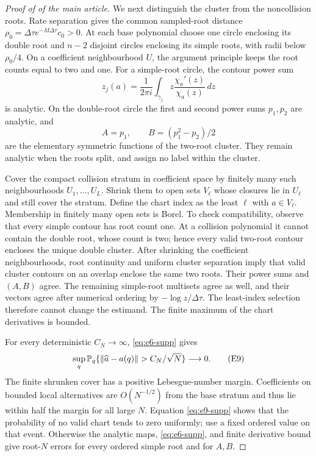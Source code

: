 \begin{proof}[Proof of  of the main article]
We next distinguish the cluster from the noncollision roots.  Rate separation
gives the common sampled-root distance
\(\rho_0=\Delta\tau e^{-M\Delta\tau}c_0>0\).  At each base polynomial choose
one circle enclosing its double root and \(n-2\) disjoint circles enclosing
its simple roots, with radii below \(\rho_0/4\).  On a coefficient
neighbourhood \(U\), the argument principle keeps the root counts equal to
two and one.  For a simple-root circle, the contour power sum
\[
 z_j(a)=\frac1{2\pi i}\int_{\gamma_j}
 z\frac{\chi_a'(z)}{\chi_a(z)}\,dz
\tag{E7}\label{eq:e7-supp}
\]
is analytic.  On the double-root circle the first and second power sums
\(p_1,p_2\) are analytic, and
\[
 A=p_1,\qquad B=(p_1^2-p_2)/2
\tag{E8}\label{eq:e8-supp}
\]
are the elementary symmetric functions of the two-root cluster.  They remain
analytic when the roots split, and assign no label within the cluster.

Cover the compact collision stratum in coefficient space by finitely many
such neighbourhoods \(U_1,\ldots,U_L\).  Shrink them to open sets
\(V_\ell\) whose closures lie in \(U_\ell\) and still cover the stratum.
Define the chart index as the least \(\ell\) with
\(\widehat a\in V_\ell\).  Membership in finitely many open sets is Borel.
To check compatibility, observe that every simple contour has root count one.
At a collision polynomial it cannot contain the double root, whose count is
two; hence every valid two-root contour encloses the unique double cluster.
After shrinking the coefficient neighbourhoods, root continuity and uniform
cluster separation imply that valid cluster contours on an overlap enclose
the same two roots.  Their power sums and \((A,B)\) agree.  The remaining
simple-root multisets agree as well, and their vectors agree after numerical
ordering by \(-\log z/\Delta\tau\).  The least-index selection therefore
cannot change the estimand.  The finite maximum of the chart derivatives is
bounded.

For every deterministic \(C_N\to\infty\), \eqref{eq:e6-supp} gives
\[
 \sup_q\PP_q\{\|\widehat a-a(q)\|>C_N/\sqrt N\}\longrightarrow0.
\tag{E9}\label{eq:e9-supp}
\]
The finite shrunken cover has a positive Lebesgue-number margin.  Coefficients
on bounded local alternatives are \(O(N^{-1/2})\) from the base stratum and
thus lie within half the margin for all large \(N\).  Equation
\eqref{eq:e9-supp} shows that the probability of no valid chart tends to zero
uniformly; use a fixed ordered value on that event.  Otherwise the analytic
maps, \eqref{eq:e6-supp}, and finite derivative bound give root-\(N\) errors for
every ordered simple root and for \(A,B\).


\end{proof}
